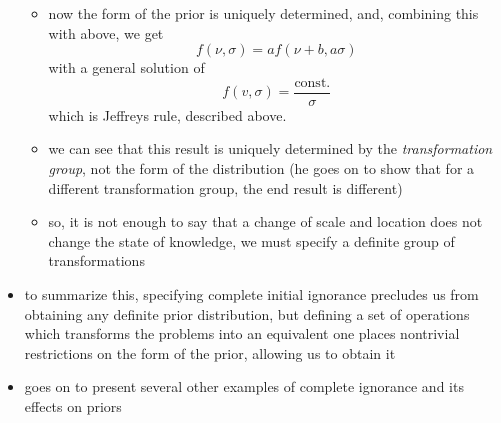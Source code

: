 \documentclass[../jaynes_prob_theory_notes.tex]{subfiles}
\begin{document}
\begin{itemize}
\begin{itemize}
                            \item now the form of the prior is uniquely determined, and, combining this with above, we get
                                \begin{equation*} 
                                    f(\nu, \sigma) = af(\nu + b, a\sigma)
                                \end{equation*}
                                with a general solution of
                                \begin{equation*} 
                                    f(v, \sigma) = \frac{\text{const.}}{\sigma}
                                \end{equation*}
                                which is Jeffreys rule, described above.
                            \item we can see that this result is uniquely determined by the \textit{transformation group}, not the form of the distribution (he goes on to show that for a different transformation group, the end result is different)
                            \item so, it is not enough to say that a change of scale and location does not change the state of knowledge, we must specify a definite group of transformations
                        \end{itemize}
                    \item to summarize this, specifying complete initial ignorance precludes us from obtaining any definite prior distribution, but defining a set of operations which transforms the problems into an equivalent one places nontrivial restrictions on the form of the prior, allowing us to obtain it
                    \item goes on to present several other examples of complete ignorance and its effects on priors
                \end{itemize}
\end{document}
